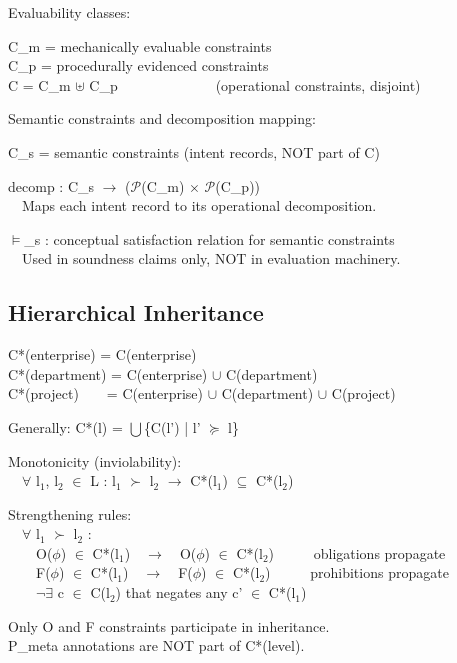 Evaluability classes:
\begin{claddisp}
C\_m = mechanically evaluable constraints\\
C\_p = procedurally evidenced constraints\\
C = C\_m $\uplus$ C\_p~~~~~~~~~~~~~~(operational constraints, disjoint)
\end{claddisp}


Semantic constraints and decomposition mapping:
\begin{claddisp}
C\_s = semantic constraints (intent records, NOT part of C)
\par\smallskip
decomp : C\_s $\to$ ($\mathcal{P}$(C\_m) $\times$ $\mathcal{P}$(C\_p))\\
~~Maps each intent record to its operational decomposition.
\par\smallskip
$\vDash$\_s : conceptual satisfaction relation for semantic constraints\\
~~Used in soundness claims only, NOT in evaluation machinery.
\end{claddisp}


\subsection{Hierarchical Inheritance}
\label{sec:formal-model-A-1-5}


\begin{cladnote}
C*(enterprise) = C(enterprise)\\
C*(department) = C(enterprise) $\cup$ C(department)\\
C*(project)~~~~= C(enterprise) $\cup$ C(department) $\cup$ C(project)
\par\smallskip
Generally: C*(l) = $\bigcup$\{C(l') | l' $\succeq$ l\}
\par\smallskip
Monotonicity (inviolability):\\
~~$\forall$ l$_1$, l$_2$ $\in$ L : l$_1$ $\succ$ l$_2$ $\to$ C*(l$_1$) $\subseteq$ C*(l$_2$)
\par\smallskip
Strengthening rules:\\
~~$\forall$ l$_1$ $\succ$ l$_2$ :\\
~~~~O($\phi$) $\in$ C*(l$_1$)~~$\to$~~O($\phi$) $\in$ C*(l$_2$)~~~~~\textemdash{} obligations propagate\\
~~~~F($\phi$) $\in$ C*(l$_1$)~~$\to$~~F($\phi$) $\in$ C*(l$_2$)~~~~~\textemdash{} prohibitions propagate\\
~~~~$\neg$$\exists$ c $\in$ C(l$_2$) that negates any c' $\in$ C*(l$_1$)
\par\smallskip
Only O and F constraints participate in inheritance.\\
P\_meta annotations are NOT part of C*(level).
\end{cladnote}


